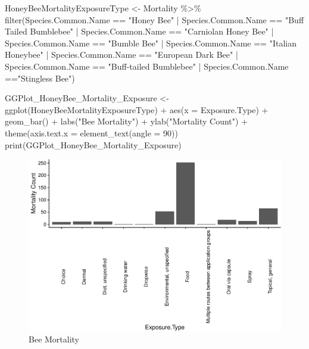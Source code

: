 \documentclass[
  12pt,
]{article}
\newenvironment{Shaded}{\begin{snugshade}}{\end{snugshade}}
\newcommand{\AttributeTok}[1]{\textcolor[rgb]{0.77,0.63,0.00}{#1}}
\newcommand{\DecValTok}[1]{\textcolor[rgb]{0.00,0.00,0.81}{#1}}
\newcommand{\FunctionTok}[1]{\textcolor[rgb]{0.00,0.00,0.00}{#1}}
\newcommand{\NormalTok}[1]{#1}
\newcommand{\OtherTok}[1]{\textcolor[rgb]{0.56,0.35,0.01}{#1}}
\newcommand{\SpecialCharTok}[1]{\textcolor[rgb]{0.00,0.00,0.00}{#1}}
\newcommand{\StringTok}[1]{\textcolor[rgb]{0.31,0.60,0.02}{#1}}
\begin{document}
\begin{Shaded}
\begin{Highlighting}[]
\NormalTok{ HoneyBeeMortalityExposureType }\OtherTok{\textless{}{-}}\NormalTok{ Mortality }\SpecialCharTok{\%\textgreater{}\%}
  \FunctionTok{filter}\NormalTok{(Species.Common.Name }\SpecialCharTok{==} \StringTok{"Honey Bee"} \SpecialCharTok{|}\NormalTok{ Species.Common.Name }\SpecialCharTok{==} \StringTok{"Buff Tailed Bumblebee"} \SpecialCharTok{|}\NormalTok{ Species.Common.Name }\SpecialCharTok{==} \StringTok{"Carniolan Honey Bee"} \SpecialCharTok{|}\NormalTok{ Species.Common.Name }\SpecialCharTok{==} \StringTok{"Bumble Bee"} \SpecialCharTok{|}\NormalTok{ Species.Common.Name }\SpecialCharTok{==} \StringTok{"Italian Honeybee"} \SpecialCharTok{|}\NormalTok{ Species.Common.Name }\SpecialCharTok{==} \StringTok{"European Dark Bee"} \SpecialCharTok{|}\NormalTok{ Species.Common.Name }\SpecialCharTok{==} \StringTok{"Buff{-}tailed Bumblebee"} \SpecialCharTok{|}\NormalTok{ Species.Common.Name }\SpecialCharTok{==}\StringTok{"Stingless Bee"}\NormalTok{)}

\NormalTok{ GGPlot\_HoneyBee\_Mortality\_Exposure }\OtherTok{\textless{}{-}} \FunctionTok{ggplot}\NormalTok{(HoneyBeeMortalityExposureType) }\SpecialCharTok{+}
   \FunctionTok{aes}\NormalTok{(}\AttributeTok{x =}\NormalTok{ Exposure.Type) }\SpecialCharTok{+}
   \FunctionTok{geom\_bar}\NormalTok{() }\SpecialCharTok{+}
   \FunctionTok{labs}\NormalTok{(}\StringTok{"Bee Mortality"}\NormalTok{) }\SpecialCharTok{+}
   \FunctionTok{ylab}\NormalTok{(}\StringTok{"Mortality Count"}\NormalTok{) }\SpecialCharTok{+}
   \FunctionTok{theme}\NormalTok{(}\AttributeTok{axis.text.x =} \FunctionTok{element\_text}\NormalTok{(}\AttributeTok{angle =} \DecValTok{90}\NormalTok{))}
 \FunctionTok{print}\NormalTok{(GGPlot\_HoneyBee\_Mortality\_Exposure)}
\end{Highlighting}
\end{Shaded}

\begin{figure}
\centering
\includegraphics{Project_Template_files/figure-latex/unnamed-chunk-3-1.pdf}
\caption{Bee Mortality}
\end{figure}
\end{document}
